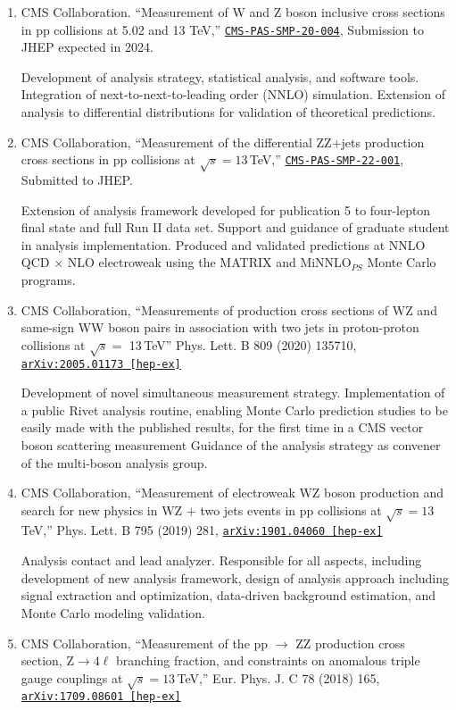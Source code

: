 \documentclass[a4paper]{article}
\begin{document}
\begin{enumerate}
  \item CMS Collaboration. ``Measurement of W and Z boson inclusive cross sections in pp collisions at 5.02 and 13 TeV,'' 
    \href{https://cds.cern.ch/record/2868090}{\texttt{CMS-PAS-SMP-20-004}}, Submission to JHEP expected in 2024.

    Development of analysis strategy, statistical analysis, and software tools. Integration of next-to-next-to-leading order (NNLO) simulation.
    Extension of analysis to differential distributions for validation of theoretical predictions.

  \item CMS Collaboration, ``Measurement of the differential ZZ+jets production cross sections in pp collisions at $\sqrt{s} = 13$\,TeV,'' 
    \href{https://cds.cern.ch/record/2859350}{\texttt{CMS-PAS-SMP-22-001}}, Submitted to JHEP.

    Extension of analysis framework developed for publication 5 to four-lepton final state and full Run II data set.
    Support and guidance of graduate student in analysis implementation. 
    Produced and validated predictions at NNLO QCD $\times$ NLO electroweak using the MATRIX 
    and MiNNLO$_{PS}$ Monte Carlo programs.

  \item CMS Collaboration, ``Measurements of production cross sections of WZ and same-sign WW boson pairs in association with two jets in proton-proton collisions at $\sqrt{s} =$ 13\,TeV'' Phys. Lett. B 809 (2020) 135710, \href{https://arxiv.org/abs/2005.01173}{\texttt{arXiv:2005.01173 [hep-ex]}}

    Development of novel simultaneous measurement strategy. 
    Implementation of a public Rivet analysis routine, enabling Monte Carlo prediction studies to be easily made 
    with the published results, for the first time in a CMS vector boson scattering measurement
    Guidance of the analysis strategy as convener of the multi-boson analysis group.
  \item CMS Collaboration, ``Measurement of electroweak WZ boson production and search for new physics in WZ $+$ two jets events in pp collisions at $\sqrt{s}=13$\,TeV,'' Phys. Lett. B 795 (2019) 281, \href{https://arxiv.org/abs/1901.04060} {\texttt{arXiv:1901.04060 [hep-ex]}}

    Analysis contact and lead analyzer. Responsible for all aspects, 
    including development of new analysis framework, design of analysis approach including signal extraction and optimization,
    data-driven background estimation, and Monte Carlo modeling validation. 
  \item CMS Collaboration, ``Measurement of the pp $\rightarrow$ ZZ production cross section, $\mathrm{Z} \to 4\ell$ branching fraction, and constraints on anomalous triple gauge couplings at $\sqrt{s} = 13$\,TeV,'' Eur. Phys. J. C 78 (2018) 165, \href{https://arxiv.org/abs/1709.08601}{\texttt{arXiv:1709.08601 [hep-ex]}}


\end{enumerate}
\end{document}
